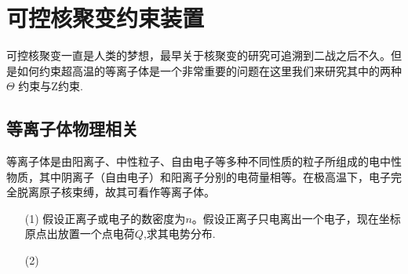 \documentclass{article}
\begin{document}
\section*{可控核聚变约束装置}
可控核聚变一直是人类的梦想，最早关于核聚变的研究可追溯到二战之后不久。但是如何约束超高温的等离子体是一个非常重要的问题在这里我们来研究其中的两种$\Theta$ 约束与$\mathrm{Z}$约束.
\subsection*{等离子体物理相关}
等离子体是由阳离子、中性粒子、自由电子等多种不同性质的粒子所组成的电中性物质，其中阴离子（自由电子）和阳离子分别的电荷量相等。在极高温下，电子完全脱离原子核束缚，故其可看作等离子体。
\begin{itemize}
    \item[(1)]假设正离子或电子的数密度为$n$。假设正离子只电离出一个电子，现在坐标原点出放置一个点电荷$Q$,求其电势分布.
    \item[(2)] 
\end{itemize}
\end{document}
